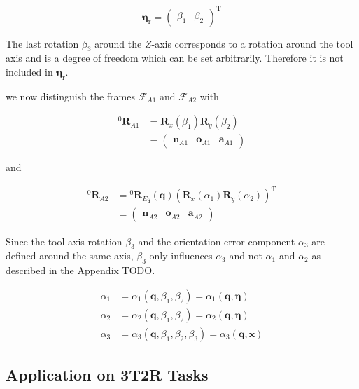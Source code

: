 \documentclass[twocolumn,10pt]{IFTOMM}
\newcommand{\bm}[1]{\boldsymbol{#1}}
\newcommand{\vek}[3]{\boldsymbol{#1}^{#2}_{#3}}
\newcommand{\rotmat}[2]{{{ }^{#1}\boldsymbol{R}}_{#2}}
\newcommand{\transp}[0]{{\mathrm{T}}}
\newcommand{\ks}[1]{{\mathcal{F}}_{#1}}
\begin{document}
\begin{equation}
\bm{\eta}_{\mathrm{r}}
=
\begin{pmatrix}
\beta_1  & \beta_2
\end{pmatrix}^\transp
\end{equation}

The last rotation $\beta_3$ around the $Z$-axis corresponds to a rotation around the tool axis and is a degree of freedom which can be set arbitrarily. Therefore it is not included in $\bm{\eta}_{\mathrm{r}}$.


we now distinguish the frames $\ks{A1}$ and $\ks{A2}$ with


\begin{align}
\rotmat{0}{A1} 
&= 
\bm{R}_x(\beta_1) \bm{R}_y(\beta_2)\\
&=
\begin{pmatrix}
\vek{n}{}{A1} & \vek{o}{}{A1} & \vek{a}{}{A1}
\end{pmatrix} \nonumber
\end{align}


and

\begin{align}
\rotmat{0}{A2} 
&= 
\rotmat{0}{Eq}(\bm{q})
\left(\bm{R}_x(\alpha_1) \bm{R}_y(\alpha_2)\right)^\transp \\ 
&=
\begin{pmatrix}
\vek{n}{}{A2} & \vek{o}{}{A2} & \vek{a}{}{A2}
\end{pmatrix}\nonumber
\end{align}

Since the tool axis rotation $\beta_3$ and the orientation error component $\alpha_3$ are defined around the same axis, $\beta_3$ only influences $\alpha_3$ and not $\alpha_1$ and $\alpha_2$ as described in the Appendix TODO.

\begin{align}
\alpha_1&=\alpha_1(\bm{q},\beta_1,\beta_2) = \alpha_1(\bm{q},\bm{\eta})\\
\alpha_2&=\alpha_2(\bm{q},\beta_1,\beta_2) = \alpha_2(\bm{q},\bm{\eta}) \\
\alpha_3&=\alpha_3(\bm{q},\beta_1,\beta_2,\beta_3) = \alpha_3(\bm{q},\bm{x})
\end{align}


\subsection{Application on 3T2R Tasks}

\end{document}
